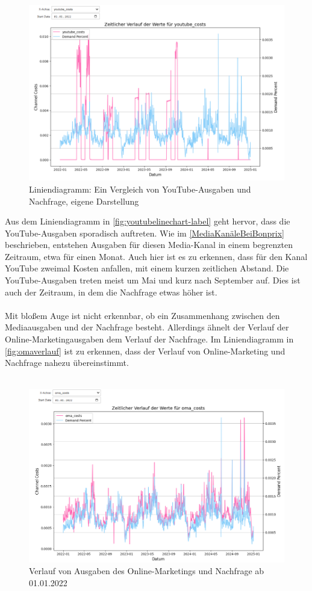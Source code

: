 \begin{figure}[ht]
    \centering
    \includegraphics[width=0.98\linewidth]{images/youtubeLineChart.png}
    \caption{Liniendiagramm: Ein Vergleich von YouTube-Ausgaben und Nachfrage, eigene Darstellung}
    \label{fig:youtubelinechart-label}
\end{figure}
Aus dem Liniendiagramm in \autoref{fig:youtubelinechart-label} geht hervor, dass die YouTube-Ausgaben sporadisch auftreten. Wie im \autoref{MediaKanäleBeiBonprix} beschrieben, entstehen Ausgaben für diesen Media-Kanal in einem begrenzten Zeitraum, etwa für einen Monat. Auch hier ist es zu erkennen, dass für den Kanal YouTube zweimal Kosten anfallen, mit einem kurzen zeitlichen Abstand. Die YouTube-Ausgaben treten meist um Mai und kurz nach September auf. Dies ist auch der Zeitraum, in dem die Nachfrage etwas höher ist. \\\\
Mit bloßem Auge ist nicht erkennbar, ob ein Zusammenhang zwischen den Mediaausgaben und der Nachfrage besteht. Allerdings ähnelt der Verlauf der Online-Marketingausgaben dem Verlauf der Nachfrage. Im Liniendiagramm in \autoref{fig:omaverlauf} ist zu erkennen, dass der Verlauf von Online-Marketing und Nachfrage nahezu übereinstimmt. \\\\
\begin{figure}[H]
    \centering
    \includegraphics[width=0.75\linewidth]{images/omacosts.png}
    \caption{Verlauf von Ausgaben des Online-Marketings und Nachfrage ab 01.01.2022}
    \label{fig:omaverlauf}
\end{figure}
